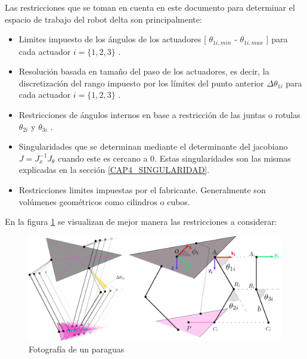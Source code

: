     Las restricciones que se toman en cuenta en este documento para determinar el espacio de trabajo del robot delta son principalmente: 
   
    \begin{itemize}
    	\item Limites impuesto de los ángulos de los actuadores [  \(  \theta _{1i,min} \)  -   \(  \theta _{1i,max} \)  ] para cada actuador  \( i= \{ 1,2,3 \}  \)  .\par
    
    	\item Resolución basada en tamaño del paso de los actuadores, es decir, la discretización del rango impuesto por los límites del punto anterior  \(  \Delta  \theta _{1i} \)  para cada actuador  \( i= \{ 1,2,3 \}  \) .\par
    
    	\item Restricciones de ángulos internos en base a restricción de las juntas o rotulas  \(  \theta _{2i} \)  y  \(  \theta _{3i} \) .\par
    
    	\item Singularidades que se determinan mediante el determinante del jacobiano  \( J=J_{x}^{-1}J_{ \theta } \)   cuando este es cercano a 0. Estas singularidades son las mismas explicadas en la sección \ref{CAP4_SINGULARIDAD}.
    	
    	\item Restricciones limites impuestas por el fabricante. Generalmente son volúmenes geométricos como cilindros o cubos.	
    	
    \end{itemize}
    
    
    En la figura \ref{f:Cap4_ws_2} se visualizan de mejor manera las restricciones a considerar:
    
    
    \begin{figure}[htb]
        \centering
        \includegraphics[width=1\linewidth]{Main/Chapter4/Images4/DIBUJO51.jpg}
        \caption{Fotografía de un paraguas}
        \label{f:Cap4_ws_2}
    \end{figure}   

